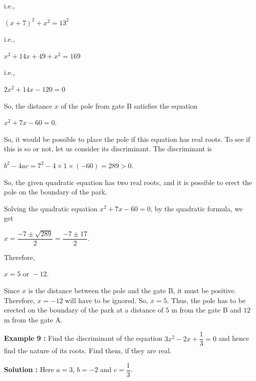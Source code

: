 \documentclass[11pt]{article}
\begin{document}
i.e.,

\begin{center}
$(x + 7)^2 + x^2 = 13^2$
\end{center}

i.e.,

\begin{center}
$x^2 + 14x + 49 + x^2 = 169$
\end{center}

i.e.,

\begin{center}
$2x^2 + 14x - 120 = 0$
\end{center}

So, the distance $x$ of the pole from gate B satisfies the equation

\begin{center}
$x^2 + 7x - 60 = 0$.
\end{center}

So, it would be possible to place the pole if this equation has real roots.
To see if this is so or not, let us consider its discriminant.
The discriminant is

\begin{center}
$b^2 - 4ac = 7^2 - 4 \times 1 \times (-60) = 289 > 0$.
\end{center}

So, the given quadratic equation has two real roots, and it is possible to erect
the pole on the boundary of the park.

Solving the quadratic equation $x^2 + 7x - 60 = 0$, by the quadratic formula, we get

\begin{center}
$x = \dfrac{-7 \pm \sqrt{289}}{2} = \dfrac{-7 \pm 17}{2}$.
\end{center}
Therefore,

\begin{center}
$x = 5 \text{ or } -12$.
\end{center}

Since $x$ is the distance between the pole and the gate B, it must be positive.
Therefore, $x = -12$ will have to be ignored. So, $x = 5$. Thus, the pole has to be erected on the boundary of the park at a distance of
$5$ m from the gate B and $12$ m from the gate A.

\medskip
\noindent\textcolor{chapterblue}{\textbf{Example 9 :}}
Find the discriminant of the equation
$3x^2 - 2x + \dfrac{1}{3} = 0$ and hence find the nature of its roots.
Find them, if they are real.

\medskip
\noindent\textcolor{chapterblue}{\textbf{Solution :}}
Here $a = 3$, $b = -2$ and $c = \dfrac{1}{3}$.
\end{document}
